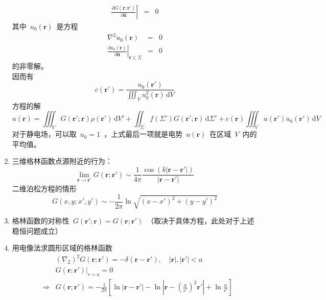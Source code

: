 \documentclass[12pt,a4paper]{article}
\newcommand\diff{\,\mathrm{d}}
\renewcommand*{\vec}[1]{\bm{#1}}%
\renewcommand{\[}{\ $\displaystyle}
\renewcommand{\]}{$\ }%
\begin{document}
\begin{enumerate}
\begin{eqnarray*}
	    	 \left.\frac{\partial G(\vec r;\vec r')}{\partial \hat{\vec n}}\right| &=& 0
	    	\end{eqnarray*}
	    	其中\[u_0(\vec r)\]是方程
	    	\begin{eqnarray*}
	    	 \nabla^2 u_0(\vec r) &=& 0 \\
	    	 \left.\frac{\partial u_0(\vec r)}{\partial \hat{\vec n}}\right|_{\vec r \in \Sigma} &=& 0
	    	\end{eqnarray*}
	    	的非零解。\\
	    	因而有
	    	$$
	    	  c(\vec r') = \frac{u_0(\vec r')}{\iiint_V u_0^2(\vec r)\diff V}
	    	$$
	    	方程的解
	    	$$
	    	  u(\vec r) = \iiint_{V}G(\vec r';\vec r)\rho(\vec r')\diff V' + \iint_{\Sigma}f(\Sigma')G(\vec r';\vec r) \diff \Sigma' + c(\vec r)\iiint_{V} u(\vec r')u_0(\vec r')\diff V
	    	$$
	    	对于静电场，可以取\[u_0 = 1\]，上式最后一项就是电势\[u(\vec r)\]在区域\[V\]内的平均值。
	    \item 三维格林函数点源附近的行为：
	    $$
	      \lim_{\vec r \to \vec r'}G(\vec r;\vec r')\sim \frac 1{4\pi}\frac{\cos (k|\vec r - \vec r'|)}{|\vec r - \vec r'|}
	    $$%
	    二维泊松方程的情形
	    $$
	      G(x,y;x',y')\sim -\frac{1}{2\pi}\ln\sqrt{(x-x')^2+(y-y')^2}
	    $$
	   \item 格林函数的对称性\[G(\vec r';\vec r ) = G(\vec r ; \vec r')\]（取决于具体方程，此处对于上述稳恒问题成立）
	   \item 用电像法求圆形区域的格林函数
	   	\begin{eqnarray*}
	   	 &&(\nabla_2)^2 G(\vec r;\vec r') = -\delta(\vec r - \vec r'),\quad |\vec r|,|\vec r'|<a \\
	   	 &&G(\vec r;\vec r')|_{r=a} = 0\\
	   	 &\Rightarrow & G(\vec r;\vec r') = -\frac{1}{2\pi}\left[\ln |\vec r- \vec r'| - \ln\left|\vec r - \left(\frac{a}{r'}\right)^2\vec r'\right|+\ln\frac{a}{r'}\right]
	   	\end{eqnarray*}
	  \end{enumerate}
	  
\end{document}
